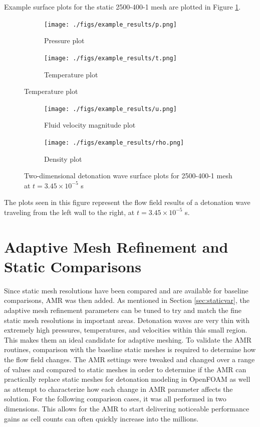 Example surface plots for the static 2500-400-1 mesh are plotted in Figure \ref{fig:2dsurface}. 
\begin{figure}[]
    \centering
    \begin{subfigure}[]{\textwidth}
        \centering
        \texttt{[image: ./figs/example\_results/p.png]}
        \caption{Pressure plot}
    \end{subfigure}

    \begin{subfigure}[]{\textwidth}
        \centering
        \texttt{[image: ./figs/example\_results/t.png]}
        \caption{Temperature plot}
    \end{subfigure}

\end{figure}
\begin{figure} \ContinuedFloat
    
    \begin{subfigure}[]{\textwidth}
        \centering
        \texttt{[image: ./figs/example\_results/u.png]}
        \caption{Fluid velocity magnitude plot}
    \end{subfigure}

    \begin{subfigure}[]{\textwidth}
        \centering
        \texttt{[image: ./figs/example\_results/rho.png]}
        \caption{Density plot}
    \end{subfigure}

    \caption{Two-dimensional detonation wave surface plots for 2500-400-1 mesh at \(t = 3.45 \times 10^{ - 5} \) s}
    \label{fig:2dsurface}
\end{figure}%
\noindent The plots seen in this figure represent the flow field results of a detonation wave traveling from the left wall to the right, at \(t = 3.45 \times 10^{ - 5} \) s. 





\section{Adaptive Mesh Refinement and Static Comparisons}
Since static mesh resolutions have been compared and are available for baseline comparisons, AMR was then added. As mentioned in Section \ref{sec:staticvar}, the adaptive mesh refinement parameters can be tuned to try and match the fine static mesh resolutions in important areas. Detonation waves are very thin with extremely high pressures, temperatures, and velocities within this small region. This makes them an ideal candidate for adaptive meshing. To validate the AMR routines, comparison with the baseline static meshes is required to determine how the flow field changes. The AMR settings were tweaked and changed over a range of values and compared to static meshes in order to determine if the AMR can practically replace static meshes for detonation modeling in OpenFOAM as well as attempt to characterize how each change in AMR parameter affects the solution. For the following comparison cases, it was all performed in two dimensions. This allows for the AMR to start delivering noticeable performance gains as cell counts can often quickly increase into the millions. 

